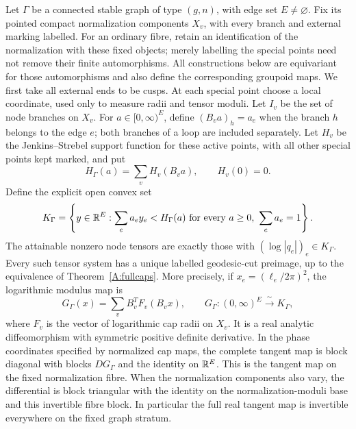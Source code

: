 \begin{theorem}
\label{A:graph-radius-domain}
Let $\Gamma$ be a connected stable graph of type $(g,n)$, with edge set
$E\ne\varnothing$. Fix its pointed compact normalization components
$X_v$, with every branch and external marking labelled. For an ordinary
fibre, retain an identification of the normalization with these fixed
objects; merely labelling the special points need not remove their
finite automorphisms. All constructions below are equivariant for
those automorphisms and also define the corresponding groupoid maps.
We first take
all external ends to be cusps. At each special point choose a local
coordinate, used only to measure radii and tensor moduli. Let $I_v$ be
the set of node branches on $X_v$. For $a\in[0,\infty)^E$, define
$(B_va)_h=a_e$ when the branch $h$ belongs to the edge $e$; both branches
of a loop are included separately. Let $H_v$ be the Jenkins--Strebel
support function for these active points, with all other special points
kept marked, and put
\[
 H_\Gamma(a)=\sum_v H_v(B_va),\qquad H_v(0)=0.
\]
Define the explicit open convex set
\[
 K_\Gamma=\left\{y\in{\mathbb{R}}^E:
       \sum_e a_e y_e<H_\Gamma(a)
       \text{ for every }a\geq0,\ \sum_ea_e=1\right\}.
\]
The attainable nonzero node tensors are exactly those with
$(\log|q_e|)_e\in K_\Gamma$. Every such tensor system has a unique
labelled geodesic-cut preimage, up to the equivalence of
Theorem~\ref{A:fullcaps}. More precisely, if
$x_e=(\ell_e/2\pi)^2$, the logarithmic modulus map is
\[
 G_\Gamma(x)=\sum_v B_v^T F_v(B_vx),\qquad
 G_\Gamma:(0,\infty)^E\xrightarrow{\ \sim\ }K_\Gamma,
\]
where $F_v$ is the vector of logarithmic cap radii on $X_v$.
It is a real analytic diffeomorphism with symmetric positive definite
derivative. In the phase coordinates specified by normalized cap maps,
the complete tangent map is block diagonal with blocks $DG_\Gamma$
and the identity on ${\mathbb{R}}^E$. This is the tangent map on the fixed
normalization fibre. When the normalization components also vary,
the differential is block triangular with the identity on the
normalization-moduli base and this invertible fibre block. In
particular the full real tangent map is invertible everywhere on
the fixed graph stratum.
\end{theorem}

